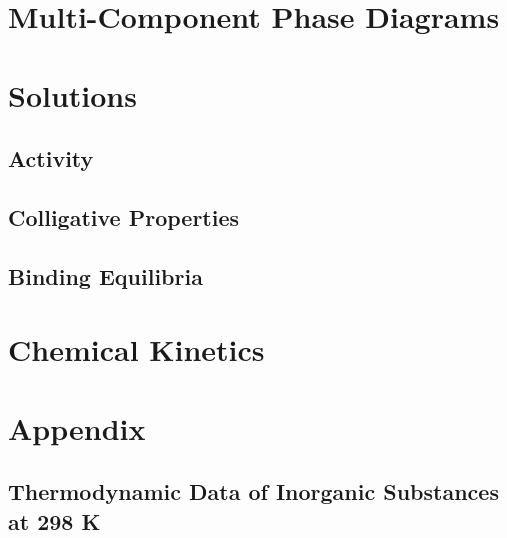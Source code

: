 \documentclass[
  9pt,
]{extbook}
\theoremstyle{definition}
\theoremstyle{definition}
\theoremstyle{definition}
\theoremstyle{remark}
\begin{document}
\hypertarget{MCPhaseDiagrams}{%
\chapter{Multi-Component Phase Diagrams}\label{MCPhaseDiagrams}}

\hypertarget{Solutions}{%
\chapter{Solutions}\label{Solutions}}

\hypertarget{activity}{%
\section{Activity}\label{activity}}

\hypertarget{colligative-properties}{%
\section{Colligative Properties}\label{colligative-properties}}

\hypertarget{binding-equilibria}{%
\section{Binding Equilibria}\label{binding-equilibria}}

\hypertarget{Kinetics}{%
\chapter{Chemical Kinetics}\label{Kinetics}}

\renewcommand*{\standardstate}{{-\kern-6pt{\ominus}\kern-6pt-}}

\hypertarget{appendix}{%
\chapter{Appendix}\label{appendix}}

\hypertarget{thermodynamic-data-of-inorganic-substances-at-298-k}{%
\section{Thermodynamic Data of Inorganic Substances at 298 K}\label{thermodynamic-data-of-inorganic-substances-at-298-k}}

\tiny
\end{document}
